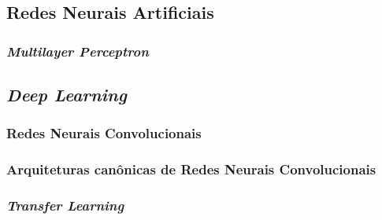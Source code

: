 
\subsection{Redes Neurais Artificiais}
\label{subsec:rna}

\subsubsection{\emph{Multilayer Perceptron}}
\label{subsubsec:mlp}


\subsection{\emph{Deep Learning}}
\label{subsec:dl}

\subsubsection{Redes Neurais Convolucionais}
\label{subsubsec:cnns}

\subsubsection{Arquiteturas canônicas de Redes Neurais Convolucionais}
\label{subsubsec:arq-cnns}

\subsubsection{\emph{Transfer Learning}}
\label{subsubsec:transfer}
